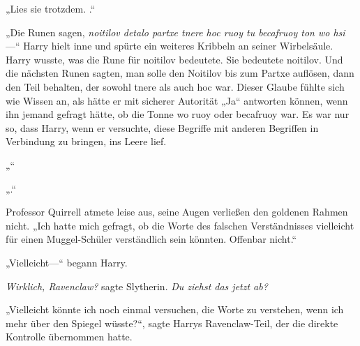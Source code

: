 „Lies sie trotzdem. .“

„Die Runen sagen, \emph{noitilov detalo partxe tnere hoc ruoy tu becafruoy ton wo hsi}—“ Harry hielt inne und spürte ein weiteres Kribbeln an seiner Wirbelsäule.
Harry wusste, was die Rune für noitilov bedeutete. Sie bedeutete noitilov. Und die nächsten Runen sagten, man solle den Noitilov bis zum Partxe auflösen, dann den Teil behalten, der sowohl tnere als auch hoc war. Dieser Glaube fühlte sich wie Wissen an, als hätte er mit sicherer Autorität „Ja“ antworten können, wenn ihn jemand gefragt hätte, ob die Tonne wo ruoy oder becafruoy war. Es war nur so, dass Harry, wenn er versuchte, diese Begriffe mit anderen Begriffen in Verbindung zu bringen, ins Leere lief.

„“

„.“

Professor Quirrell atmete leise aus, seine Augen verließen den goldenen Rahmen nicht. „Ich hatte mich gefragt, ob die Worte des falschen Verständnisses vielleicht für einen Muggel-Schüler verständlich sein könnten. Offenbar nicht.“

„Vielleicht—“ begann Harry.

\emph{Wirklich, Ravenclaw?} sagte Slytherin. \emph{Du ziehst das \emph{jetzt} ab?}

„Vielleicht könnte ich noch einmal versuchen, die Worte zu verstehen, wenn ich mehr über den Spiegel wüsste?“, sagte Harrys Ravenclaw-Teil, der die direkte Kontrolle übernommen hatte.

